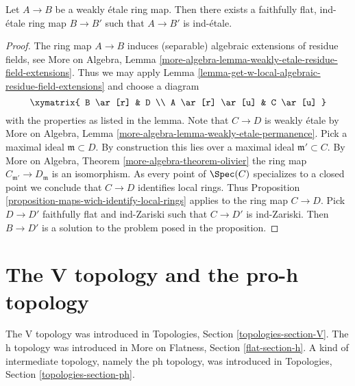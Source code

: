 \begin{proposition}
\label{proposition-weakly-etale}
Let $A \to B$ be a weakly \'etale ring map.
Then there exists a faithfully flat, ind-\'etale ring map
$B \to B'$ such that $A \to B'$ is ind-\'etale.
\end{proposition}

\begin{proof}
The ring map $A \to B$ induces (separable) algebraic extensions of
residue fields, see More on Algebra, Lemma
\ref{more-algebra-lemma-weakly-etale-residue-field-extensions}.
Thus we may apply
Lemma \ref{lemma-get-w-local-algebraic-residue-field-extensions}
and choose a diagram
$$
\xymatrix{
B \ar[r] & D \\
A \ar[r] \ar[u] & C \ar[u]
}
$$
with the properties as listed in the lemma. Note that $C \to D$
is weakly \'etale by
More on Algebra, Lemma \ref{more-algebra-lemma-weakly-etale-permanence}.
Pick a maximal ideal $\mathfrak m \subset D$. By construction
this lies over a maximal ideal $\mathfrak m' \subset C$.
By More on Algebra, Theorem \ref{more-algebra-theorem-olivier}
the ring map $C_{\mathfrak m'} \to D_\mathfrak m$ is an isomorphism.
As every point of $\Spec(C)$ specializes to a closed point we conclude that
$C \to D$ identifies local rings.
Thus Proposition \ref{proposition-maps-wich-identify-local-rings}
applies to the ring map $C \to D$. Pick $D \to D'$ faithfully flat
and ind-Zariski such that $C \to D'$ is ind-Zariski. Then
$B \to D'$ is a solution to the problem posed in the proposition.
\end{proof}





\section{The V topology and the pro-h topology}
\label{section-V-versus-pro-h}

\noindent
The V topology was introduced in
Topologies, Section \ref{topologies-section-V}.
The h topology was introduced in
More on Flatness, Section \ref{flat-section-h}.
A kind of intermediate topology, namely the ph topology,
was introduced in Topologies, Section \ref{topologies-section-ph}.

